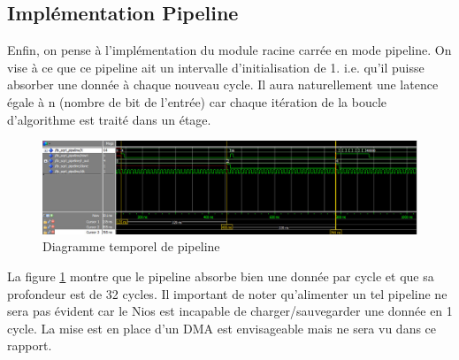 \documentclass[12pt,a4paper]{article}
\begin{document}
\subsection{Implémentation Pipeline}
Enfin, on pense à l'implémentation du module racine carrée en mode pipeline. On vise à ce que ce pipeline ait un intervalle d'initialisation de 1. i.e. qu'il puisse absorber une donnée à chaque nouveau cycle. Il aura naturellement une latence égale à n (nombre de bit de l'entrée) car chaque itération de la boucle d'algorithme est traité dans un étage.
\begin{figure}[H]
	\centering
	\includegraphics[width=\linewidth]{figures/pipeline}
	\caption{Diagramme temporel de pipeline}
	\label{fig:pipeline}
\end{figure}
La figure \ref{fig:pipeline} montre que le pipeline absorbe bien une donnée par cycle et que sa profondeur est de 32 cycles. Il important de noter qu'alimenter un tel pipeline ne sera pas évident car le Nios est incapable de charger/sauvegarder une donnée en 1 cycle. La mise est en place d'un DMA est envisageable mais ne sera vu dans ce rapport.
\end{document}
